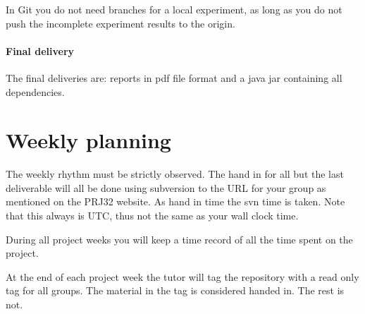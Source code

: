 In Git you do not need branches for a local experiment, as long as you
do not push the incomplete experiment results to the origin.

\paragraph{Final delivery} The final deliveries are: reports in pdf file format and a java
jar containing all dependencies.


\section{Weekly planning}
The weekly rhythm must be strictly observed. The hand in for all but
the last deliverable will all be done using subversion to the URL
for your group as mentioned on the PRJ32 website. As hand in time the
svn time is taken. Note that this always is UTC, thus not the same as
your wall clock time.

During all project weeks you will keep a time record of all
the time spent on the project.

At the end of each project week the tutor will tag the repository with
a read only tag for all groups. The material in the tag is considered
handed in. The rest is not.

